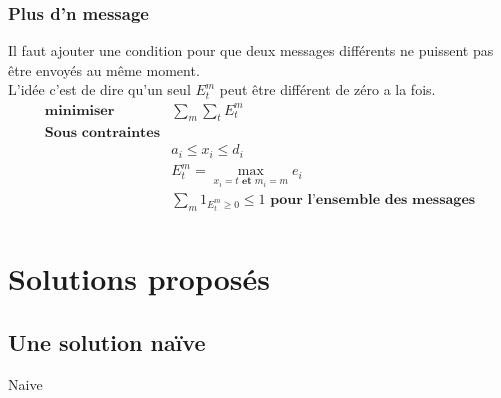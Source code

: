 \documentclass[runningheads]{llncs}
\begin{document}
\subsubsection{Plus d'n message}
Il faut ajouter une condition pour que deux messages différents ne puissent pas être envoy\'es au même moment.\\
L'idée c'est de dire qu'un seul $E_t^m$ peut être différent de zéro a la fois.
\[
    \begin{array}{cc}
         \textbf{minimiser} &  \sum \limits_{m}\sum\limits_{t} E_t^m\\
         \textbf{Sous contraintes} & \\
         & a_i \leq x_i \leq d_i\\
         & E_t^m = \max\limits_{x_i=t \textbf{ et } m_i=m} e_i \\
         & \sum\limits_{m}  1_{ E_t^m\geq 0} \leq 1 \textbf{ pour l'ensemble des messages} \\
    \end{array}
\]

\section{Solutions propos\'es }
\subsection{Une solution na\"ive }
\begin{algorithm}[H]
    \caption{Naive}%
    \label{alg:naive}
    \begin{algorithmic}[1]
        \EndFor{}
        
    
    \end{algorithmic}
\end{algorithm}


  
\end{document}
